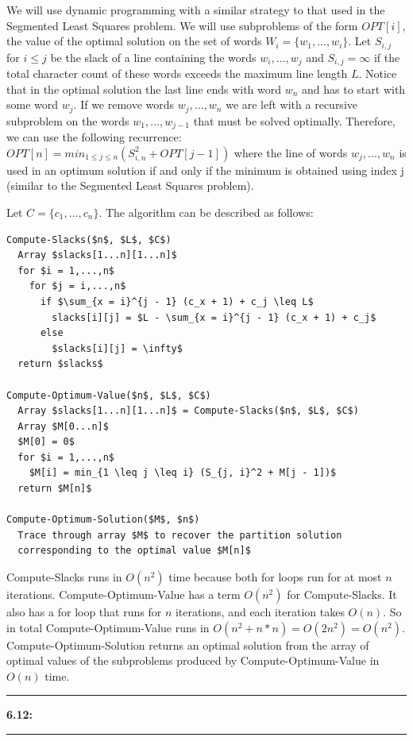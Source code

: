 \documentclass[11pt]{article}
\newcommand\question[2]{\vspace{.25in}\hrule\textbf{#1: #2}\vspace{.5em}\hrule\vspace{.10in}}
\begin{document}
We will use dynamic programming with a similar strategy to that used in the Segmented Least Squares problem. We will use subproblems of the form $OPT[i]$, the value of the optimal solution on the set of words $W_i = \{w_1,...,w_i\}$. Let $S_{i, j}$ for $i \leq j$ be the slack of a line containing the words $w_i,...,w_j$ and $S_{i, j} = \infty$ if the total character count of these words exceeds the maximum line length $L$. Notice that in the optimal solution the last line ends with word $w_n$ and has to start with some word $w_j$. If we remove words $w_j,...,w_n$ we are left with a recursive subproblem on the words $w_1,...,w_{j - 1}$ that must be solved optimally. Therefore, we can use the following recurrence: $OPT[n] = min_{1 \leq j \leq n} (S_{i, n}^2 + OPT[j - 1])$ where the line of words $w_j,...,w_n$ is used in an optimum solution if and only if the minimum is obtained using index j (similar to the Segmented Least Squares problem).

Let $C = \{c_1,...,c_n\}$. The algorithm can be described as follows:

\begin{lstlisting}
Compute-Slacks($n$, $L$, $C$)
  Array $slacks[1...n][1...n]$
  for $i = 1,...,n$
    for $j = i,...,n$
      if $\sum_{x = i}^{j - 1} (c_x + 1) + c_j \leq L$
        slacks[i][j] = $L - \sum_{x = i}^{j - 1} (c_x + 1) + c_j$
      else
        $slacks[i][j] = \infty$
  return $slacks$

Compute-Optimum-Value($n$, $L$, $C$)
  Array $slacks[1...n][1...n]$ = Compute-Slacks($n$, $L$, $C$)
  Array $M[0...n]$
  $M[0] = 0$
  for $i = 1,...,n$
    $M[i] = min_{1 \leq j \leq i} (S_{j, i}^2 + M[j - 1])$
  return $M[n]$

Compute-Optimum-Solution($M$, $n$)
  Trace through array $M$ to recover the partition solution 
  corresponding to the optimal value $M[n]$
\end{lstlisting}

Compute-Slacks runs in $O(n^2)$ time because both for loops run for at most $n$ iterations. Compute-Optimum-Value has a term $O(n^2)$ for Compute-Slacks. It also has a for loop that runs for $n$ iterations, and each iteration takes $O(n)$. So in total Compute-Optimum-Value runs in $O(n^2 + n * n) = O(2n^2) = O(n^2)$. Compute-Optimum-Solution returns an optimal solution from the array of optimal values of the subproblems produced by Compute-Optimum-Value in $O(n)$ time.

\clearpage

\question{6.12}{}
\end{document}
